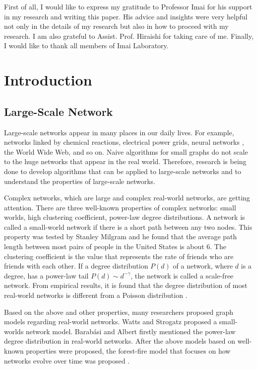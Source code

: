 \documentclass[senior,final,11pt]{iscs-thesis}
\begin{document}
\begin{acknowledge}
  First of all, I would like to express my gratitude to Professor Imai for his support in my research and writing this paper. His advice and insights were very helpful not only in the details of my research but also in how to proceed with my research. I am also grateful to Assist. Prof. Hiraishi for taking care of me. Finally, I would like to thank all members of Imai Laboratory.
\end{acknowledge}

\frontmatter %
\tableofcontents %
\mainmatter %

\chapter{Introduction}
\section{Large-Scale Network}
Large-scale networks appear in many places in our daily lives. For example, networks linked by chemical reactions, electrical power grids, neural networks , the World Wide Web, and so on. Naive algorithms for small graphs do not scale to the huge networks that appear in the real world. Therefore, research is being done to develop algorithms that can be applied to large-scale networks and to understand the properties of large-scale networks.

Complex networks, which are large and complex real-world networks, are getting attention. There are three well-known properties of complex networks: small worlds, high clustering coefficient, power-law degree distributions. A network is called a small-world network if there is a short path between any two nodes. This property was tested by Stanley Milgram \cite{milgram1967small} and he found that the average path length between most pairs of people in the United States is about 6. The clustering coefficient is the value that represents the rate of friends who are friends with each other. If a degree distribution $P(d)$ of a network, where $d$ is a degree, has a power-law tail $P(d) \sim d^{-\gamma}$, the network is called a scale-free network. From empirical results, it is found that the degree distribution of most real-world networks is different from a Poisson distribution \cite{albert2002statistical}.

Based on the above and other properties, many researchers proposed graph models regarding real-world networks.  Watts and Strogatz \cite{watts1998collective} proposed a small-worlds network model. Barabási and Albert \cite{barabasi1999emergence} firstly mentioned the power-law degree distribution in real-world networks. After the above models based on well-known properties were proposed, the forest-fire model that focuses on how networks evolve over time was proposed \cite{leskovec2007graph}.
\end{document}
